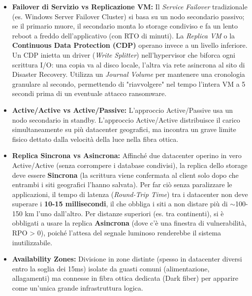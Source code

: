 \begin{itemize}
    \item \textbf{Failover di Servizio vs Replicazione VM:} Il \textit{Service Failover} tradizionale (es. Windows Server Failover Cluster) si basa su un nodo secondario passivo; se il primario muore, il secondario monta lo storage condiviso e fa un lento reboot a freddo dell'applicativo (con RTO di minuti). La \textit{Replica VM} o la \textbf{Continuous Data Protection (CDP)} operano invece a un livello inferiore. Un CDP inietta un driver (\textit{Write Splitter}) nell'hypervisor che biforca ogni scrittura I/O: una copia va al disco locale, l'altra via rete asincrona al sito di Disaster Recovery. Utilizza un \textit{Journal Volume} per mantenere una cronologia granulare al secondo, permettendo di "riavvolgere" nel tempo l'intera VM a 5 secondi prima di un eventuale attacco ransomware.
    \item \textbf{Active/Active vs Active/Passive:} L'approccio Active/Passive usa un nodo secondario in standby. L'approccio Active/Active distribuisce il carico simultaneamente su più datacenter geografici, ma incontra un grave limite fisico dettato dalla velocità della luce nella fibra ottica.
    \item \textbf{Replica Sincrona vs Asincrona:} Affinché due datacenter operino in vero Active/Active (senza corrompere i database condivisi), la replica dello storage deve essere \textbf{Sincrona} (la scrittura viene confermata al client solo dopo che entrambi i siti geografici l'hanno salvata). Per far ciò senza paralizzare le applicazioni, il tempo di latenza (\textit{Round-Trip Time}) tra i datacenter non deve superare i \textbf{10-15 millisecondi}, il che obbliga i siti a non distare più di $\sim$100-150 km l'uno dall'altro. Per distanze superiori (es. tra continenti), si è obbligati a usare la replica \textbf{Asincrona} (dove c'è una finestra di vulnerabilità, RPO > 0), poiché l'attesa del segnale luminoso renderebbe il sistema inutilizzabile.
    \item \textbf{Availability Zones:} Divisione in zone distinte (spesso in datacenter diversi entro la soglia dei 15ms) isolate da guasti comuni (alimentazione, allagamenti) ma connesse in fibra ottica dedicata (Dark fiber) per apparire come un'unica grande infrastruttura logica.
\end{itemize}

